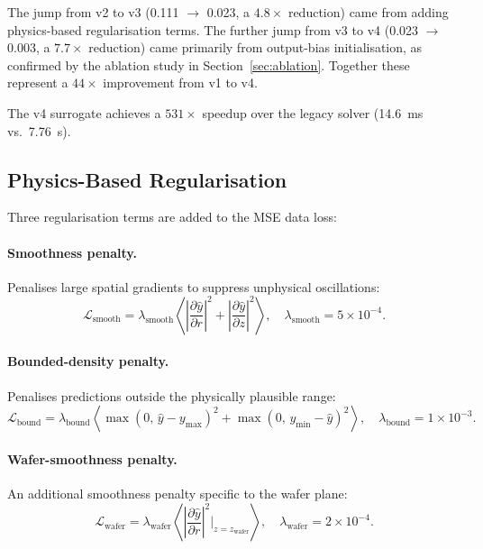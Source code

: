 \documentclass[12pt,a4paper]{article}
\begin{document}
The jump from v2 to v3 (0.111 $\to$ 0.023, a $4.8\times$ reduction)
came from adding physics-based regularisation terms.  The further jump
from v3 to v4 (0.023 $\to$ 0.003, a $7.7\times$ reduction) came
primarily from output-bias initialisation, as confirmed by the
ablation study in Section~\ref{sec:ablation}.  Together these
represent a $44\times$ improvement from v1 to v4.

The v4 surrogate achieves a $531\times$ speedup over the legacy
solver (\SI{14.6}{\milli\second} vs.\ \SI{7.76}{\second}).

\subsection{Physics-Based Regularisation}

Three regularisation terms are added to the MSE data loss:

\paragraph{Smoothness penalty.}
Penalises large spatial gradients to suppress unphysical oscillations:
\begin{equation}
  \mathcal{L}_{\text{smooth}}
  = \lambda_{\text{smooth}}
    \left\langle
      \left|\frac{\partial \hat{y}}{\partial r}\right|^2
      + \left|\frac{\partial \hat{y}}{\partial z}\right|^2
    \right\rangle,
  \quad \lambda_{\text{smooth}} = 5 \times 10^{-4}.
  \label{eq:smooth}
\end{equation}

\paragraph{Bounded-density penalty.}
Penalises predictions outside the physically plausible range:
\begin{equation}
  \mathcal{L}_{\text{bound}}
  = \lambda_{\text{bound}}
    \left\langle
      \max(0,\, \hat{y} - y_{\max})^2
      + \max(0,\, y_{\min} - \hat{y})^2
    \right\rangle,
  \quad \lambda_{\text{bound}} = 1 \times 10^{-3}.
  \label{eq:bound}
\end{equation}

\paragraph{Wafer-smoothness penalty.}
An additional smoothness penalty specific to the wafer plane:
\begin{equation}
  \mathcal{L}_{\text{wafer}}
  = \lambda_{\text{wafer}}
    \left\langle
      \left|\frac{\partial \hat{y}}{\partial r}\right|^2
      \bigg|_{z = z_{\text{wafer}}}
    \right\rangle,
  \quad \lambda_{\text{wafer}} = 2 \times 10^{-4}.
  \label{eq:wafer_smooth}
\end{equation}
\end{document}
